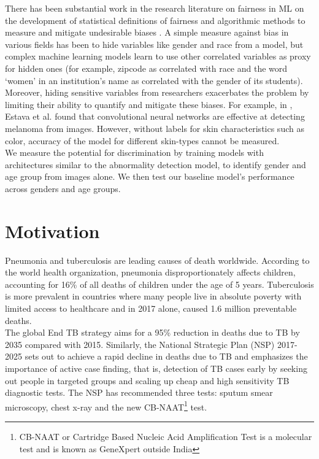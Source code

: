 \documentclass[12pt,oneside,a4paper]{report}
\begin{document}
There has been substantial work in the research literature on fairness in ML on
the development of statistical definitions of fairness
\cite{chouldechova2017fair,dwork2012fairness,hardt2016equality} and algorithmic
methods to measure and mitigate undesirable biases
\cite{agarwal2018reductions,hardt2016equality,kusner2017counterfactual}. A
simple measure against bias in various fields has been to hide variables like
gender and race from a model, but complex machine learning models learn to use
other correlated variables as proxy for hidden ones (for example, zipcode as
correlated with race and the word `women' in an institution's name as correlated
with the gender of its students\cite{dastin_2018}). Moreover, hiding sensitive
variables from researchers exacerbates the problem by limiting their ability to
quantify and mitigate these biases. For example, in
\cite{esteva2017dermatologist}, Estava et al. found that convolutional neural
networks are effective at detecting melanoma from images. However, without
labels for skin characteristics such as color, accuracy of the
model for different skin-types cannot be measured.\\

We measure the potential for discrimination by
training models with architectures similar to the abnormality detection model,
to identify gender and age group from images alone.
We then test our baseline model's performance across genders and age groups.

\section{Motivation\label{motivation}}
Pneumonia and tuberculosis are leading causes of death worldwide. According to
the world health organization, pneumonia disproportionately affects children,
accounting for 16\% of all deaths of children under the age of 5
years\cite{who_pneumonia}. Tuberculosis is more prevalent in countries where
many people live in absolute poverty\cite{tb_poverty} with limited access to
healthcare and in 2017 alone, caused 1.6
million preventable deaths\cite{who_tb}.\\

The global End TB strategy aims for a 95\% reduction in deaths due to TB by 2035
compared with 2015. Similarly, the National Strategic Plan (NSP) 2017-2025 sets
out to achieve a rapid decline in deaths due to TB and emphasizes the importance
of active case finding, that is, detection of TB cases early by seeking out
people in targeted groups and scaling up cheap and high sensitivity TB
diagnostic tests. The NSP has recommended three tests: sputum smear microscopy,
chest x-ray and the new CB-NAAT\footnote{CB-NAAT or Cartridge Based Nucleic Acid
  Amplification Test is a molecular test and is
  known as GeneXpert outside India} test.\\
\end{document}
